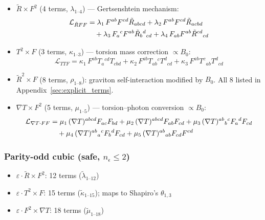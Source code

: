 \documentclass[12pt,a4paper]{article}
\newcommand{\Rt}{\tilde{R}}         %
\newcommand{\del}{\nabla}            %
\newcommand{\eps}{\varepsilon}       %
\begin{document}
\begin{itemize}
  \item \textbf{$\Rt \times F^2$} (4 terms, $\lambda_{1\text{--}4}$) ---
    Gertsenshtein mechanism:
    \begin{align}
      \mathcal{L}_{\Rt FF} &=
        \lambda_1\, F^{ab} F^{cd} \Rt_{abcd}
      + \lambda_2\, F^{ab} F^{cd} \Rt_{acbd}
      \notag\\&\quad
      + \lambda_3\, F_{a}{}^{c} F^{ab} \Rt_{b}{}^{d}{}_{cd}
      + \lambda_4\, F_{ab} F^{ab} \Rt^{cd}{}_{cd}
      \label{eq:curv_ff}
    \end{align}

  \item \textbf{$T^2 \times F$} (3 terms, $\kappa_{1\text{--}3}$) ---
    torsion mass correction $\propto B_0$:
    \begin{equation}
      \mathcal{L}_{TTF} =
        \kappa_1\, F^{ab} T_{a}{}^{cd} T_{cbd}
      + \kappa_2\, F^{ab} T_{ab}{}^{c} T^{d}{}_{cd}
      + \kappa_3\, F^{ab} T^{c}{}_{ab} T^{d}{}_{cd}
      \label{eq:ttf}
    \end{equation}

  \item \textbf{$\Rt^2 \times F$} (8 terms, $\rho_{1\text{--}8}$):
    graviton self-interaction modified by $B_0$.
    All 8 listed in Appendix~\ref{sec:explicit_terms}.

  \item \textbf{$\del T \times F^2$} (5 terms, $\mu_{1\text{--}5}$) ---
    torsion--photon conversion $\propto B_0$:
    \begin{align}
      \mathcal{L}_{\del T\cdot FF} &=
        \mu_1\, (\del T)^{abcd} F_{ac} F_{bd}
      + \mu_2\, (\del T)^{abcd} F_{ab} F_{cd}
      + \mu_3\, (\del T)^{ab}{}_{b}{}^{c} F_{a}{}^{d} F_{cd}
      \notag\\&\quad
      + \mu_4\, (\del T)^{ab}{}_{a}{}^{c} F_{b}{}^{d} F_{cd}
      + \mu_5\, (\del T)^{ab}{}_{ab} F_{cd} F^{cd}
      \label{eq:dtff}
    \end{align}
\end{itemize}

\subsubsection{Parity-odd cubic (safe, $n_\epsilon \leq 2$)}

\begin{itemize}
  \item $\eps \cdot \Rt \times F^2$: 12 terms
    ($\tilde{\lambda}_{1\text{--}12}$)
  \item $\eps \cdot T^2 \times F$: 15 terms
    ($\tilde{\kappa}_{1\text{--}15}$);
    maps to Shapiro's $\theta_{1,3}$~\cite{Shapiro:2001rz}
  \item $\eps \cdot F^2 \times \del T$: 18 terms
    ($\tilde{\mu}_{1\text{--}18}$)
\end{itemize}
\end{document}
